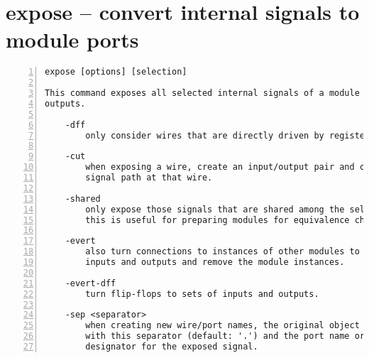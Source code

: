 \section{expose -- convert internal signals to module ports}
\label{cmd:expose}
\begin{lstlisting}[numbers=left,frame=single]
    expose [options] [selection]

This command exposes all selected internal signals of a module as additional
outputs.

    -dff
        only consider wires that are directly driven by register cell.

    -cut
        when exposing a wire, create an input/output pair and cut the internal
        signal path at that wire.

    -shared
        only expose those signals that are shared among the selected modules.
        this is useful for preparing modules for equivalence checking.

    -evert
        also turn connections to instances of other modules to additional
        inputs and outputs and remove the module instances.

    -evert-dff
        turn flip-flops to sets of inputs and outputs.

    -sep <separator>
        when creating new wire/port names, the original object name is suffixed
        with this separator (default: '.') and the port name or a type
        designator for the exposed signal.
\end{lstlisting}

